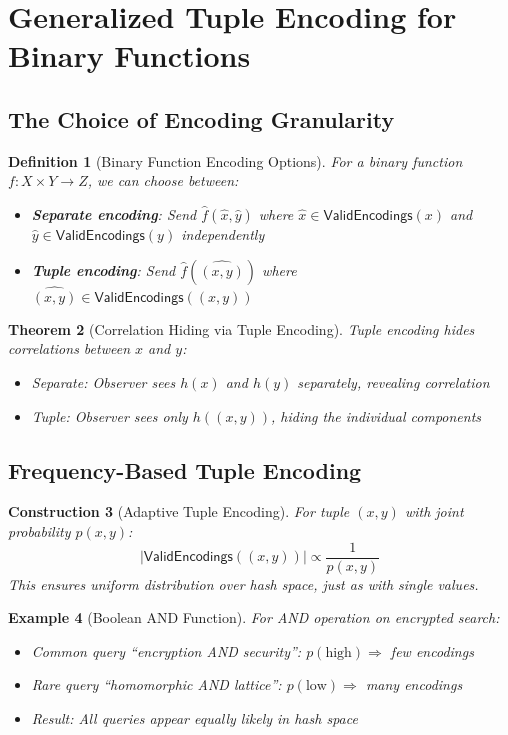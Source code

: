 \documentclass[11pt,final,hidelinks]{article}
\newcommand{\ValidEnc}{\mathsf{ValidEncodings}}
\newtheorem{theorem}{Theorem}[section]
\newtheorem{definition}[theorem]{Definition}
\newtheorem{example}[theorem]{Example}
\newtheorem{construction}[theorem]{Construction}
\begin{document}
\section{Generalized Tuple Encoding for Binary Functions}

\subsection{The Choice of Encoding Granularity}

\begin{definition}[Binary Function Encoding Options]
For a binary function $f: X \times Y \to Z$, we can choose between:
\begin{itemize}
    \item \textbf{Separate encoding}: Send $\hat{f}(\hat{x}, \hat{y})$ where $\hat{x} \in \ValidEnc(x)$ and $\hat{y} \in \ValidEnc(y)$ independently
    \item \textbf{Tuple encoding}: Send $\hat{f}(\widehat{(x,y)})$ where $\widehat{(x,y)} \in \ValidEnc((x,y))$
\end{itemize}
\end{definition}

\begin{theorem}[Correlation Hiding via Tuple Encoding]
Tuple encoding hides correlations between $x$ and $y$:
\begin{itemize}
    \item Separate: Observer sees $h(x)$ and $h(y)$ separately, revealing correlation
    \item Tuple: Observer sees only $h((x,y))$, hiding the individual components
\end{itemize}
\end{theorem}

\subsection{Frequency-Based Tuple Encoding}

\begin{construction}[Adaptive Tuple Encoding]
For tuple $(x,y)$ with joint probability $p(x,y)$:
\begin{equation}
|\ValidEnc((x,y))| \propto \frac{1}{p(x,y)}
\end{equation}
This ensures uniform distribution over hash space, just as with single values.
\end{construction}

\begin{example}[Boolean AND Function]
For AND operation on encrypted search:
\begin{itemize}
    \item Common query ``encryption AND security'': $p(\text{high}) \Rightarrow$ few encodings
    \item Rare query ``homomorphic AND lattice'': $p(\text{low}) \Rightarrow$ many encodings
    \item Result: All queries appear equally likely in hash space
\end{itemize}
\end{example}
\end{document}
